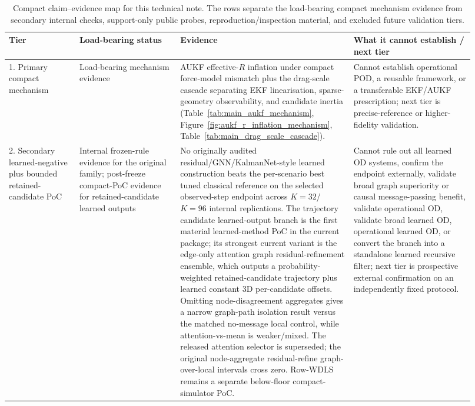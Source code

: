 \begin{table}[t]
  \centering\scriptsize
  \caption{Compact claim--evidence map for this technical note. The rows separate the load-bearing compact mechanism evidence from secondary internal checks, support-only public probes, reproduction/inspection material, and excluded future validation tiers.}
  \label{tab:main_claim_evidence_limit}
  \begingroup\setlength{\tabcolsep}{3pt}
  \begin{tabular}{@{}p{0.14\linewidth}p{0.20\linewidth}p{0.34\linewidth}p{0.24\linewidth}@{}}
    \toprule
    Tier & Load-bearing status & Evidence & What it cannot establish / next tier \\
    \midrule
    1. Primary compact mechanism & Load-bearing mechanism evidence & AUKF effective-$R$ inflation under compact force-model mismatch plus the drag-scale cascade separating EKF linearisation, sparse-geometry observability, and candidate inertia (Table~\ref{tab:main_aukf_mechanism}, Figure~\ref{fig:aukf_r_inflation_mechanism}, Table~\ref{tab:main_drag_scale_cascade}). & Cannot establish operational POD, a reusable framework, or a transferable EKF/AUKF prescription; next tier is precise-reference or higher-fidelity validation. \\
    2. Secondary learned-negative plus bounded retained-candidate PoC & Internal frozen-rule evidence for the original family; post-freeze compact-PoC evidence for retained-candidate learned outputs & No originally audited residual/GNN/KalmanNet-style learned construction beats the per-scenario best tuned classical reference on the selected observed-step endpoint across $K=32$/$K=96$ internal replications. The trajectory candidate learned-output branch is the first material learned-method PoC in the current package; its strongest current variant is the edge-only attention graph residual-refinement ensemble, which outputs a probability-weighted retained-candidate trajectory plus learned constant 3D per-candidate offsets. Omitting node-disagreement aggregates gives a narrow graph-path isolation result versus the matched no-message local control, while attention-vs-mean is weaker/mixed. The released attention selector is superseded; the original node-aggregate residual-refine graph-over-local intervals cross zero. Row-WDLS remains a separate below-floor compact-simulator PoC. & Cannot rule out all learned OD systems, confirm the endpoint externally, validate broad graph superiority or causal message-passing benefit, validate operational OD, validate broad learned OD, operational learned OD, or convert the branch into a standalone learned recursive filter; next tier is prospective external confirmation on an independently fixed protocol. \\

\end{tabular}
\end{table}
